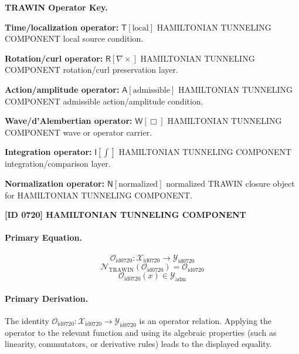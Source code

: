\par\vspace{0.45\baselineskip}
\noindent\begin{minipage}[t]{\linewidth}
\begingroup
\small
\raggedright
\textbf{TRAWIN Operator Key.}\par
\noindent\textbf{Time/localization operator:} $\mathsf{T}\!\left[\mathrm{local}\right]$ HAMILTONIAN TUNNELING COMPONENT local source condition.\par
\noindent\textbf{Rotation/curl operator:} $\mathsf{R}\!\left[\nabla\times\right]$ HAMILTONIAN TUNNELING COMPONENT rotation/curl preservation layer.\par
\noindent\textbf{Action/amplitude operator:} $\mathsf{A}\!\left[\mathrm{admissible}\right]$ HAMILTONIAN TUNNELING COMPONENT admissible action/amplitude condition.\par
\noindent\textbf{Wave/d'Alembertian operator:} $\mathsf{W}\!\left[\Box\right]$ HAMILTONIAN TUNNELING COMPONENT wave or operator carrier.\par
\noindent\textbf{Integration operator:} $\mathsf{I}\!\left[\int\right]$ HAMILTONIAN TUNNELING COMPONENT integration/comparison layer.\par
\noindent\textbf{Normalization operator:} $\mathsf{N}\!\left[\mathrm{normalized}\right]$ normalized TRAWIN closure object for HAMILTONIAN TUNNELING COMPONENT.\par
\endgroup
\end{minipage}

\clearpage
\noindent\textbf{[ID 0720] HAMILTONIAN TUNNELING COMPONENT}\par
\vspace{0.35em}
\paragraph{Primary Equation.}
\[
\mathcal{O}_{\mathrm{id0720}}:\mathcal{X}_{\mathrm{id0720}}\longrightarrow\mathcal{Y}_{\mathrm{id0720}}
\]
\[
\mathcal{N}_{\mathrm{TRAWIN}}(\mathcal{O}_{\mathrm{id0720}})=\mathcal{O}_{\mathrm{id0720}}
\]
\[
\mathcal{O}_{\mathrm{id0720}}(x)\in\mathcal{Y}_{\mathrm{adm}}
\]

\paragraph{Primary Derivation.}
The identity \( \mathcal{O}_{\mathrm{id0720}}:\mathcal{X}_{\mathrm{id0720}}\longrightarrow\mathcal{Y}_{\mathrm{id0720}} \) is an operator relation. Applying the operator to the relevant function and using its algebraic properties (such as linearity, commutators, or derivative rules) leads to the displayed equality.
